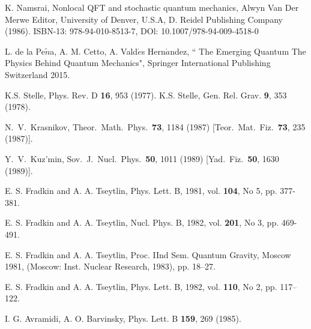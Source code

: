 \documentclass[a4paper,11pt]{article}
\begin{document}
\begin{thebibliography}{99}
K. Namsrai, Nonlocal QFT and stochastic quantum mechanics, Alwyn Van Der Merwe Editor, University of Denver, U.S.A, D. Reidel Publishing Company (1986). ISBN-13: 978-94-010-8513-7, DOl: 10.1007/978-94-009-4518-0


L. de la Pe$\tilde{n}$a, A. M. Cetto,
A. Vald$\acute{e}$s Hern$\acute{a}$ndez, ``
The Emerging Quantum The Physics Behind Quantum Mechanics", Springer International Publishing Switzerland 2015.








 K.S. Stelle, Phys. Rev. D {\bf 16}, 953 (1977).
K.S. Stelle,  Gen. Rel. Grav. {\bf 9}, 353 (1978).


N.~V.~Krasnikov,
Theor.\ Math.\ Phys.\  {\bf 73}, 1184 (1987)
[Teor.\ Mat.\ Fiz.\  {\bf 73}, 235 (1987)].










Y.~V.~Kuz'min,
Sov.\ J.\ Nucl.\ Phys.\  {\bf 50}, 1011 (1989)
[Yad.\ Fiz.\  {\bf 50}, 1630 (1989)].


E. S. Fradkin and A. A. Tseytlin, 
Phys. Lett. B, 1981, vol. {\bf 104}, No 5, pp.
377-381.

E. S. Fradkin and A. A. Tseytlin, 
Nucl. Phys. B, 1982, vol. {\bf 201}, No 3, pp.
469-491.


E. S. Fradkin and A. A. Tseytlin, 
Proc. IInd Sem. Quantum Gravity, Moscow 1981, (Moscow: Inst. Nuclear Research,
1983), pp. 18–27.


E. S. Fradkin and A. A. Tseytlin, 
Phys. Lett. B, 1982, vol. {\bf 110}, No 2, pp. 117–122.




I. G. Avramidi, A. O. Barvinsky, 
Phys. Lett. B {\bf 159}, 269 (1985).



\end{thebibliography}
\end{document}
